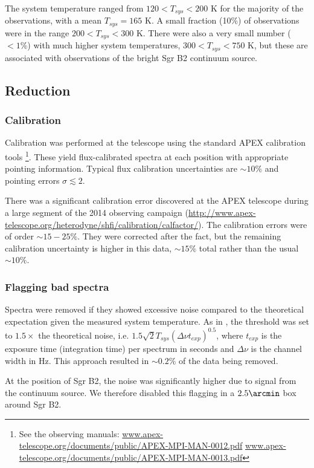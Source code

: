 The system temperature ranged from $120 < T_{sys} < 200$ K for the majority of
the observations, with a mean $T_{sys}=165$ K.  A small fraction (10\%) of
observations were in the range $200 < T_{sys} < 300$ K.  There were also a very
small number ($<1\%$) with much higher system temperatures, $300 < T_{sys} <
750$ K, but these are associated with observations of the bright Sgr B2
continuum source.

\subsection{Reduction}
\subsubsection{Calibration}
Calibration was performed at the telescope using the standard APEX calibration
tools
\footnote{See the observing manuals:
\url{www.apex-telescope.org/documents/public/APEX-MPI-MAN-0012.pdf}
\url{www.apex-telescope.org/documents/public/APEX-MPI-MAN-0013.pdf} }.
These yield flux-calibrated spectra at each position with appropriate pointing
information.  Typical flux calibration uncertainties are $\sim10\%$ and
pointing errors $\sigma\lesssim2$\arcsec. %

There was a significant calibration error discovered at the APEX telescope during
a large segment of the 2014 observing campaign
(\url{http://www.apex-telescope.org/heterodyne/shfi/calibration/calfactor/}).
The calibration errors were of order $\sim15-25\%$.  They were corrected after
the fact, but the remaining calibration uncertainty
is higher in this data, $\sim15\%$ total rather than the usual $\sim10\%$.

\subsubsection{Flagging bad spectra}
Spectra were removed if they showed excessive noise compared to the
theoretical expectation given the measured system temperature.  As in
\citet{Ao2013a}, the threshold was set to $1.5\times$ the theoretical noise,
i.e. $1.5 \sqrt{2} T_{sys} (\Delta\nu t_{exp})^{0.5}$, where $t_{exp}$ is the
exposure time (integration time) per spectrum in seconds and $\Delta\nu$ is the
channel width in Hz.  This approach resulted in $\sim0.2\%$ of the data being
removed.  

At the position of Sgr B2, the noise was significantly higher due to signal
from the continuum source.  We therefore disabled this flagging in a
$2.5\arcmin$ box around Sgr B2.


